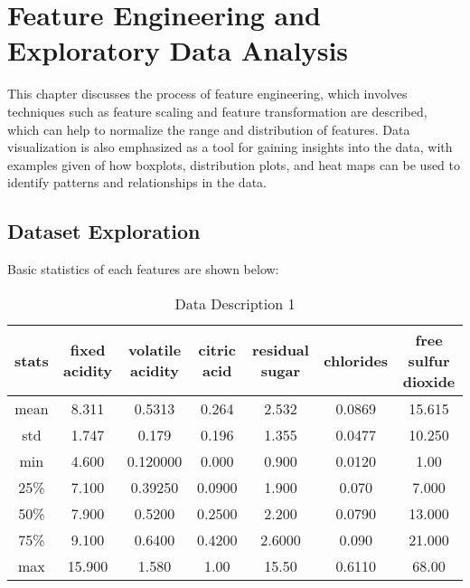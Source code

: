 \chapter{Feature Engineering and Exploratory Data Analysis}
This chapter discusses the process of feature engineering, which involves techniques such as feature scaling and feature transformation are described, which can help to normalize the range and distribution of features. Data visualization is also emphasized as a tool for gaining insights into the data, with examples given of how boxplots, distribution plots, and heat maps can be used to identify patterns and relationships in the data.

\section{Dataset Exploration}
Basic statistics of each features are shown below:

\begin{table}[H]
    \begin{center}
        \begin{tabular}{ |c|c|c|c|c|c|c| }
            \hline
            stats      & 
            fixed acidity&	volatile acidity	&citric acid&	residual sugar&	chlorides	&free sulfur dioxide  \\
            \hline
            mean & 8.311	& 0.5313	& 0.264 &	2.532 &	0.0869	& 15.615 \\
            \hline

            std & 1.747	&0.179&	0.196&	1.355	&0.0477&	10.250 \\
            \hline

            min & 4.600&	0.120000	&0.000&	0.900	&0.0120&	1.00 \\
            \hline

            25\% & 7.100	&0.39250 & 0.0900 &	1.900	&0.070&	7.000 \\
            \hline

            50\% & 7.900 &	0.5200&0.2500	&2.200&	0.0790&13.000	 \\
            \hline

            75\% & 9.100	&0.6400&0.4200&2.6000&0.090	&21.000	 \\
            \hline

            max & 15.900 &	1.580	&1.00&	15.50&	0.6110	&68.00 \\
            \hline
        \end{tabular}
    \end{center}
    \caption{Data Description 1}
    \label{table:Data Description 1}
\end{table}


